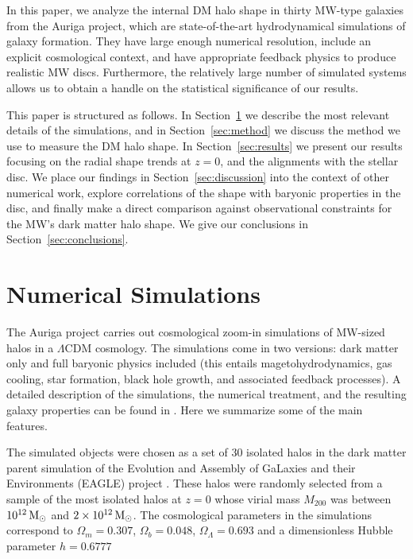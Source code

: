\documentclass[usenatbib]{mnras}
\begin{document}
In this paper, we analyze the internal DM halo shape in thirty MW-type
galaxies  from the Auriga project, which are state-of-the-art hydrodynamical simulations of galaxy formation.
They have large enough numerical resolution, include an explicit
cosmological context, and have appropriate feedback physics to produce
realistic MW discs.
Furthermore, the relatively large number of simulated systems allows us
to obtain a handle on the statistical significance of our results.

This paper is structured as follows. 
In Section~\ref{sec:numerical} we describe the most relevant details of
the simulations, and in Section~\ref{sec:method} we discuss the method
we use to measure the DM halo shape. 
In Section~\ref{sec:results} we present our results focusing on the
radial shape trends at $z=0$, and the alignments with the stellar disc.
We place our findings in Section~\ref{sec:discussion} 
into the context of other numerical work, explore correlations of the
shape with baryonic properties in the disc, and finally make a direct
comparison against observational constraints for the MW's dark matter halo shape.
We give our conclusions in Section~\ref{sec:conclusions}.


\section{Numerical Simulations}
\label{sec:numerical}

The Auriga project carries out cosmological zoom-in simulations of MW-sized 
halos in a $\Lambda$CDM cosmology. 
The simulations come in two versions: dark matter only and full 
baryonic physics included (this entails magetohydrodynamics, gas cooling, star formation, black hole growth, and associated feedback processes).
A detailed description of the simulations, the numerical treatment, and the resulting galaxy properties can be found in \citet{auriga}.
Here we summarize some of the main features.

The simulated objects were chosen as a set of 30
isolated halos in the dark matter parent simulation of the Evolution and Assembly of GaLaxies and their
Environments (EAGLE)  project \citep{Eagle}.   
These halos were randomly selected from a sample of the most isolated
halos at $z=0$ whose virial mass $M_{200}$ was between $10^{12}\, {\rm M}_\odot$ and
$2\times 10^{12}\, {\rm M}_\odot$. 
The cosmological parameters in the simulations correspond to
$\Omega_m=0.307$, $\Omega_b=0.048$, $\Omega_\Lambda=0.693$ and a
dimensionless Hubble parameter $h=0.6777$ \citep{2014A&A...571A..16P}
\end{document}
